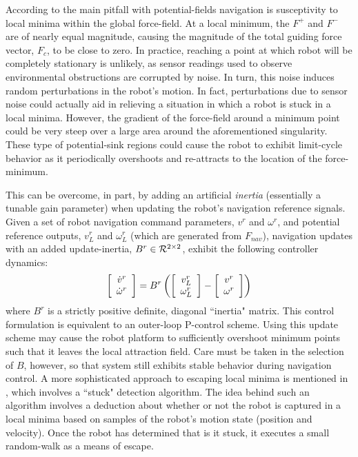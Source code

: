 		According to \cite{Koren1991} the main pitfall with potential-fields navigation is susceptivity to local minima within the global force-field. At a local minimum, the $F^{+}$ and $F^{-}$ are of nearly equal magnitude, causing the magnitude of the total guiding force vector, $F_{c}$, to be close to zero. In practice, reaching a point at which robot will be completely stationary is unlikely, as sensor readings used to observe environmental obstructions are corrupted by noise. In turn, this noise induces random perturbations in the robot's motion. In fact, perturbations due to sensor noise could actually aid in relieving a situation in which a robot is stuck in a local minima. However, the gradient of the force-field around a minimum point could be very steep over a large area around the aforementioned singularity. These type of potential-sink regions could cause the robot to exhibit limit-cycle behavior as it periodically overshoots and re-attracts to the location of the force-minimum. 

		This can be overcome, in part, by adding an artificial \emph{inertia} (essentially a tunable gain parameter) when updating the robot's navigation reference signals. Given a set of robot navigation command parameters, $v^{r}$ and $\omega^{r}$, and potential reference outputs, $v^{r}_{L}$ and $\omega^{r}_{L}$ (which are generated from $F_{nav}$), navigation updates with an added update-inertia, $B^{r}\in{\cal R}^{2\times2}$, exhibit the following controller dynamics:
			\begin{equation}
				\left[
					\begin{array}{c}
						\dot{v}^{r} 		\\
						\dot{\omega}^{r}
					\end{array}
				\right] = 
				B^{r}
				\left(
					\left[
						\begin{array}{c}
							v^{r}_{L} 	\\
							\omega^{r}_{L}
						\end{array}
					\right]
					-
					\left[
						\begin{array}{c}
							v^{r} 	\\
							\omega^{r}
						\end{array}
					\right]
				\right)
			\end{equation}
		where $B^{r}$ is a strictly positive definite, diagonal ``inertia" matrix. This control formulation is equivalent to an outer-loop P-control scheme. Using this update scheme may cause the robot platform to sufficiently overshoot minimum points such that it leaves the local attraction field. Care must be taken in the selection of $B$, however, so that system still exhibits stable behavior during navigation control. A more sophisticated approach to escaping local minima is mentioned in \cite{Krishnamurthy2007}, which involves a ``stuck" detection algorithm. The idea behind such an algorithm involves a deduction about whether or not the robot is captured in a local minima based on samples of the robot’s motion state (\IE position and velocity). Once the robot has determined that is it stuck, it executes a small random-walk as a means of escape. 

